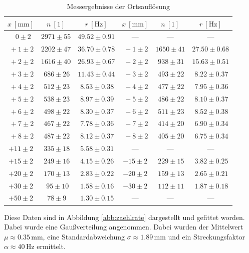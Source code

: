 \documentclass[12pt,a4paper]{scrartcl}
\numberwithin{equation}{section} %
\begin{document}
\begin{table}[h]
	\centering
	\begin{tabular}{c|c|c||c|c|c}
		$x\ [\mathrm{mm}]$ & $n\ [1]$ & $r\ [\mathrm{Hz}]$ &
		$x\ [\mathrm{mm}]$ & $n\ [1]$ & $r\ [\mathrm{Hz}]$ \\
		\hline
		$\ \ \ 0 \pm 2$ & $2971 \pm 55$ & $49.52 \pm 0.91$ &---&---&--- \\
		$\ +1 \pm 2$ & $2202 \pm 47$ & $36.70 \pm 0.78$ &
		$\ -1 \pm 2$ & $1650 \pm 41$ & $27.50 \pm 0.68$ \\
		$\ +2 \pm 2$ & $1616 \pm 40$ & $26.93 \pm 0.67$ &
		$\ -2 \pm 2$ & $\ 938 \pm 31$ & $15.63 \pm 0.51$ \\
		$\ +3 \pm 2$ & $\ 686 \pm 26$ & $11.43 \pm 0.44$ &
		$\ -3 \pm 2$ & $\ 493 \pm 22$ & $\ 8.22 \pm 0.37$ \\
		$\ +4 \pm 2$ & $\ 512 \pm 23$ & $\ 8.53 \pm 0.38$ &
		$\ -4 \pm 2$ & $\ 477 \pm 22$ & $\ 7.95 \pm 0.36$ \\
		$\ +5 \pm 2$ & $\ 538 \pm 23$ & $\ 8.97 \pm 0.39$ &
		$\ -5 \pm 2$ & $\ 486 \pm 22$ & $\ 8.10 \pm 0.37$ \\
		$\ +6 \pm 2$ & $\ 498 \pm 22$ & $\ 8.30 \pm 0.37$ &
		$\ -6 \pm 2$ & $\ 511 \pm 23$ & $\ 8.52 \pm 0.38$ \\
		$\ +7 \pm 2$ & $\ 467 \pm 22$ & $\ 7.78 \pm 0.36$ &
		$\ -7 \pm 2$ & $\ 414 \pm 20$ & $\ 6.90 \pm 0.34$ \\
		$\ +8 \pm 2$ & $\ 487 \pm 22$ & $\ 8.12 \pm 0.37$ &
		$\ -8 \pm 2$ & $\ 405 \pm 20$ & $\ 6.75 \pm 0.34$ \\
		$+11 \pm 2$ & $\ 335 \pm 18$ & $\ 5.58 \pm 0.31$ &---&---&---\\
		$+15 \pm 2$ & $\ 249 \pm 16$ & $\ 4.15 \pm 0.26$ &
		$-15 \pm 2$ & $\ 229 \pm 15$ & $\ 3.82 \pm 0.25$ \\
		$+20 \pm 2$ & $\ 170 \pm 13$ & $\ 2.83 \pm 0.22$ &
		$-20 \pm 2$ & $\ 159 \pm 13$ & $\ 2.65 \pm 0.21$ \\
		$+30 \pm 2$ & $\ \ 95 \pm 10$ & $\ 1.58 \pm 0.16$ &
		$-30 \pm 2$ & $\ 112 \pm 11$ & $\ 1.87 \pm 0.18$ \\
		$+50 \pm 2$ & $\ 78 \pm 9$ & $\ 1.30 \pm 0.15$ &---&---&---
	\end{tabular}
	\caption{Messergebnisse der Ortsauflösung}
	\label{tab:Ortsauflösung}
\end{table}

\noindent
Diese Daten sind in Abbildung \ref{abb:zaehlrate} dargestellt und gefittet worden. Dabei wurde eine Gaußverteilung angenommen. Dabei wurden der Mittelwert $\mu\approx 0.35\,\mathrm{mm}$, eine Standardabweichung $\sigma\approx1.89\,\mathrm{mm}$ und ein Streckungsfaktor $\alpha\approx 40\,\mathrm{Hz}$  ermittelt.
\end{document}
